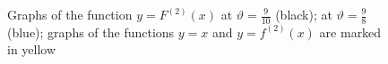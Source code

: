 \documentclass[12pt,a4paper]{amsart}
\begin{document}
\begin{figure}[h!]
\begin{minipage}[h]{0.45\linewidth}
\end{minipage}
\hspace{1cm}
\begin{minipage}[h]{0.45\linewidth}
\end{minipage}
\caption{Graphs of the function $y = F^{(2)}(x)$ at $\vartheta=\frac{9}{10}$ (black); at $\vartheta=\frac{9}{8}$ (blue);
graphs of the functions $y=x$ and $y=f^{(2)}(x)$ are marked in yellow} \label{f11}
\end{figure}
\end{document}
